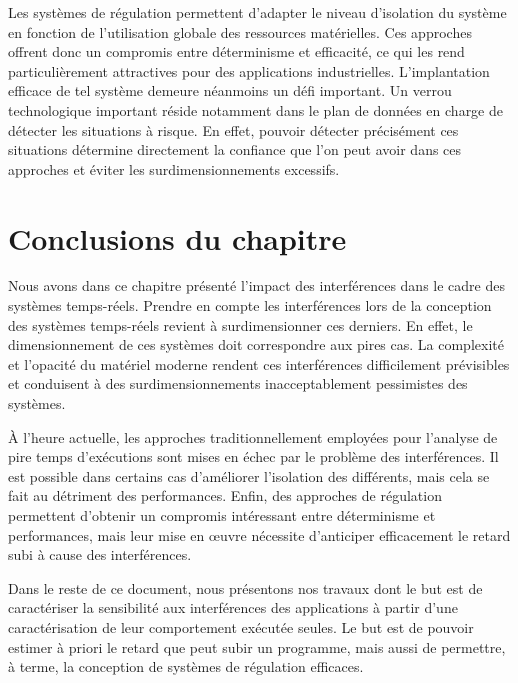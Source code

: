 Les systèmes de régulation permettent d'adapter le niveau d'isolation du système en fonction de l'utilisation globale des ressources matérielles.
Ces approches offrent donc un compromis entre déterminisme et efficacité, ce qui les rend particulièrement attractives pour des applications industrielles.
L'implantation efficace de tel système demeure néanmoins un défi important.
Un verrou technologique important réside notamment dans le plan de données en charge de détecter les situations à risque.
En effet, pouvoir détecter précisément ces situations détermine directement la confiance que l'on peut avoir dans ces approches et éviter les surdimensionnements excessifs.

\section{Conclusions du chapitre}

Nous avons dans ce chapitre présenté l'impact des interférences dans le cadre des systèmes temps-réels.
Prendre en compte les interférences lors de la conception des systèmes temps-réels revient à surdimensionner ces derniers.
En effet, le dimensionnement de ces systèmes doit correspondre aux pires cas.
La complexité et l'opacité du matériel moderne rendent ces interférences difficilement prévisibles et conduisent à des surdimensionnements inacceptablement pessimistes des systèmes.

À l'heure actuelle, les approches traditionnellement employées pour l'analyse de pire temps d'exécutions sont mises en échec par le problème des interférences.
Il est possible dans certains cas d'améliorer l'isolation des différents, mais cela se fait au détriment des performances.
Enfin, des approches de régulation permettent d'obtenir un compromis intéressant entre déterminisme et performances, mais leur mise en œuvre nécessite d'anticiper efficacement le retard subi à cause des interférences.

Dans le reste de ce document, nous présentons nos travaux dont le but est de caractériser la sensibilité aux interférences des applications à partir d'une caractérisation de leur comportement exécutée seules.
Le but est de pouvoir estimer à priori le retard que peut subir un programme, mais aussi de permettre, à terme, la conception de 
systèmes de régulation efficaces.
